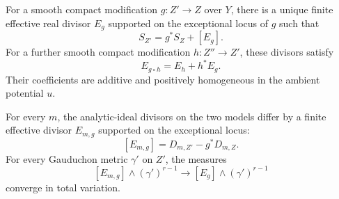 \begin{theorem}\label{thm:trace-exceptional-difference}
For a smooth compact modification $g\colon Z'\to Z$ over $Y$, there is a unique finite effective real divisor $E_g$ supported on the exceptional locus of $g$ such that
\begin{equation}\label{eq:trace-exceptional-difference}
 S_{Z'}=g^*S_Z+[E_g].
\end{equation}
For a further smooth compact modification $h\colon Z''\to Z'$, these divisors satisfy
\begin{equation}\label{eq:trace-exceptional-cocycle}
 E_{g\circ h}=E_h+h^*E_g.
\end{equation}
Their coefficients are additive and positively homogeneous in the ambient potential $u$.

For every $m$, the analytic-ideal divisors on the two models differ by a finite effective divisor $E_{m,g}$ supported on the exceptional locus:
\[
 [E_{m,g}]=D_{m,Z'}-g^*D_{m,Z}.
\]
For every Gauduchon metric $\gamma'$ on $Z'$, the measures
\[
 [E_{m,g}]\wedge(\gamma')^{r-1}
     \longrightarrow [E_g]\wedge(\gamma')^{r-1}
\]
converge in total variation.
\end{theorem}

